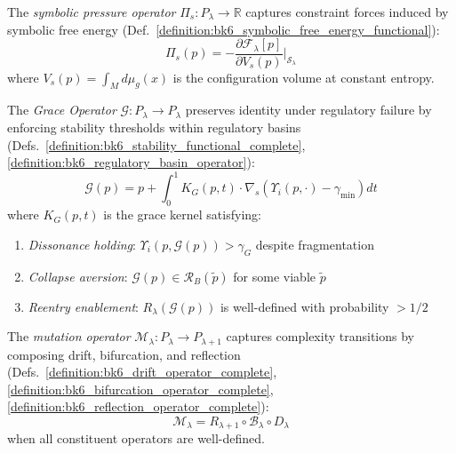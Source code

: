 \begin{definition}
\label{definition:bk6_symbolic_pressure_operator}
The \emph{symbolic pressure operator} $\Pi_s : P_\lambda \to \mathbb{R}$ captures constraint forces induced by symbolic free energy (Def.~\ref{definition:bk6_symbolic_free_energy_functional}):
\begin{equation}
\Pi_s(p) = -\frac{\partial \mathcal{F}_\lambda[p]}{\partial V_s(p)}\bigg|_{\mathcal{S}_\lambda}
\end{equation}
where $V_s(p) = \int_M d\mu_g(x)$ is the configuration volume at constant entropy.
\end{definition}

\begin{definition}
\label{definition:bk6_grace_operator_complete}
The \emph{Grace Operator} $\mathcal{G} : P_{\lambda} \to P_{\lambda}$ preserves identity under regulatory failure by enforcing stability thresholds within regulatory basins (Defs.~\ref{definition:bk6_stability_functional_complete}, \ref{definition:bk6_regulatory_basin_operator}):
\begin{equation}
\mathcal{G}(p) = p + \int_0^1 K_G(p,t) \cdot \nabla_s \left( \Upsilon_i(p, \cdot) - \gamma_{\min} \right) dt
\end{equation}
where $K_G(p,t)$ is the grace kernel satisfying:
\begin{enumerate}
\item \emph{Dissonance holding}: $\Upsilon_i(p, \mathcal{G}(p)) > \gamma_G$ despite fragmentation
\item \emph{Collapse aversion}: $\mathcal{G}(p) \in \mathcal{R}_B(\tilde{p})$ for some viable $\tilde{p}$
\item \emph{Reentry enablement}: $R_\lambda(\mathcal{G}(p))$ is well-defined with probability $> 1/2$
\end{enumerate}
\end{definition}

\begin{definition}
\label{definition:bk6_mutation_operator_complete}
The \emph{mutation operator} $\mathcal{M}_{\lambda} : P_{\lambda} \to P_{\lambda+1}$ captures complexity transitions by composing drift, bifurcation, and reflection (Defs.~\ref{definition:bk6_drift_operator_complete}, \ref{definition:bk6_bifurcation_operator_complete}, \ref{definition:bk6_reflection_operator_complete}):
\begin{equation}
\mathcal{M}_{\lambda} = R_{\lambda+1} \circ \mathcal{B}_{\lambda} \circ D_{\lambda}
\end{equation}
when all constituent operators are well-defined.
\end{definition}


